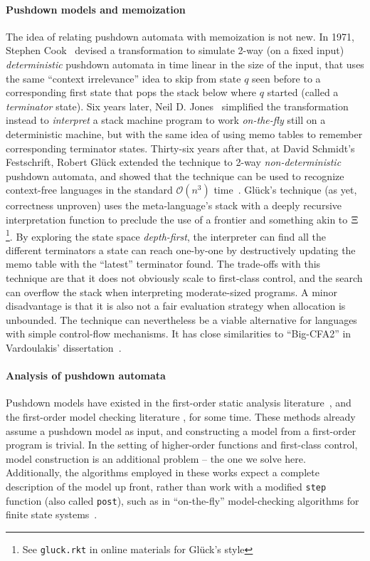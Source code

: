 \paragraph{Pushdown models and memoization}
The idea of relating pushdown automata with memoization is not new.
%
In 1971, Stephen Cook~\citep{DBLP:conf/ifip/Cook71} devised a transformation to simulate 2-way (on a fixed input) \emph{deterministic} pushdown automata in time linear in the size of the input, that uses the same ``context irrelevance'' idea to skip from state $q$ seen before to a corresponding first state that pops the stack below where $q$ started (called a \emph{terminator} state).
%
Six years later, Neil D. Jones~\citep{Jones:1977:NLT} simplified the transformation instead to \emph{interpret} a stack machine program to work \emph{on-the-fly} still on a deterministic machine, but with the same idea of using memo tables to remember corresponding terminator states.
%
Thirty-six years after that, at David Schmidt's Festschrift, Robert Gl\"uck extended the technique to 2-way \emph{non-deterministic} pushdown automata, and showed that the technique can be used to recognize context-free languages in the standard ${\mathcal O}(n^3)$ time~\citep{DBLP:journals/corr/Gluck13}.
%
Gl\"uck's technique (as yet, correctness unproven) uses the meta-language's stack with a deeply recursive interpretation function to preclude the use of a frontier and something akin to $\Xi$\footnote{See \texttt{gluck.rkt} in online materials for Gl\"uck's style}.
%
By exploring the state space \emph{depth-first}, the interpreter can find all the different terminators a state can reach one-by-one by destructively updating the memo table with the ``latest'' terminator found.
%
The trade-offs with this technique are that it does not obviously scale to first-class control, and the search can overflow the stack when interpreting moderate-sized programs.
%
A minor disadvantage is that it is also not a fair evaluation strategy when allocation is unbounded.
%
The technique can nevertheless be a viable alternative for languages with simple control-flow mechanisms.
%
It has close similarities to ``Big-CFA2'' in Vardoulakis' dissertation~\citep{vardoulakis-diss12}.

\paragraph{Analysis of pushdown automata}
Pushdown models have existed in the first-order static analysis literature~\citep[Chapter 7]{local:muchnick:jones:flow-analysis:1981}\citep{ianjohnson:reps:pushdown:1995}, and the first-order model checking literature \citep{ianjohnson:bouajiani:esparza:pushdown:1997}, for some time.
%
These methods already assume a pushdown model as input, and constructing a model from a first-order program is trivial.
%
In the setting of higher-order functions and first-class control, model construction is an additional problem -- the one we solve here.
%
Additionally, the algorithms employed in these works expect a complete description of the model up front, rather than work with a modified \texttt{step} function (also called \texttt{post}), such as in ``on-the-fly'' model-checking algorithms for finite state systems~\citep{DBLP:conf/tacas/SchwoonE05}.

